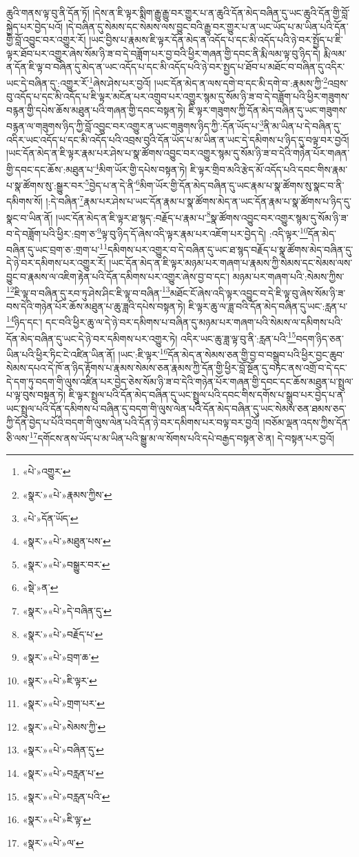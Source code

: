 ཆུའི་གནས་ལྟ་བུ་ནི་དོན་ཏོ། །དེས་ན་ཇི་ལྟར་སྨིག་རྒྱུ་རྒྱུ་བར་གྱུར་པ་ན་ཆུའི་དོན་མེད་བཞིན་དུ་ཡང་ཆུའི་དོན་གྱི་བློ་སྐྱེད་པར་བྱེད་པའོ། །དེ་བཞིན་དུ་སེམས་དང་སེམས་ལས་བྱུང་བའི་རྒྱུ་བར་གྱུར་པ་ན་ཡང་ཡོད་པ་མ་ཡིན་པའི་དོན་གྱི་བློ་འབྱུང་བར་འགྱུར་རོ། །ཡང་བྱིས་པ་རྣམས་ཇི་ལྟར་དོན་མེད་ན་འདོད་པ་དང་མི་འདོད་པའི་ཉེ་བར་སྤྱོད་པ་ཇི་ལྟར་ཐོབ་པར་འགྱུར་ཞེས་སོམ་ཉི་ཟ་བ་དེ་བཟློག་པར་བྱ་བའི་ཕྱིར་གཞན་གྱི་དབང་ནི་རྨི་ལམ་ལྟ་བུ་ཉིད་དེ། རྨི་ལམ་ན་དོན་ཇི་ལྟ་བ་བཞིན་དུ་མེད་ན་ཡང་འདོད་པ་དང་མི་འདོད་པའི་ཉེ་བར་སྤྱད་པ་ཐོབ་པ་མཐོང་བ་བཞིན་དུ་འདིར་ཡང་དེ་བཞིན་དུ་:འགྱུར་རོ་\footnote{«པེ་»འགྱུར་}ཞེས་ཤེས་པར་བྱའོ། །ཡང་དོན་མེད་ན་ལས་དགེ་བ་དང་མི་དགེ་བ་:རྣམས་ཀྱི་\footnote{«སྣར་»«པེ་»རྣམས་ཀྱིས་}འབྲས་བུ་འདོད་པ་དང་མི་འདོད་པ་ཇི་ལྟར་མངོན་པར་འགྲུབ་པར་འགྱུར་སྙམ་དུ་སོམ་ཉི་ཟ་བ་དེ་བཟློག་པའི་ཕྱིར་གཟུགས་བརྙན་གྱི་དཔེས་ཆོས་མཐུན་པའི་གཞན་གྱི་དབང་བསྟན་ཏེ། ཇི་ལྟར་གཟུགས་ཀྱི་དོན་མེད་བཞིན་དུ་ཡང་གཟུགས་བརྙན་ལ་གཟུགས་ཉིད་ཀྱི་བློ་འབྱུང་བར་འགྱུར་ན་ཡང་གཟུགས་ཉིད་ཀྱི་:དོན་ཡོད་པ་\footnote{«པེ་»དོན་ཡོད་}ནི་མ་ཡིན་པ་དེ་བཞིན་དུ་འདིར་ཡང་འདོད་པ་དང་མི་འདོད་པའི་འབྲས་བུའི་དོན་ཡོད་པ་མ་ཡིན་ན་ཡང་དེ་དམིགས་པ་ཉིད་དུ་བལྟ་བར་བྱའོ། །ཡང་དོན་མེད་ན་ཇི་ལྟར་རྣམ་པར་ཤེས་པ་སྣ་ཚོགས་འབྱུང་བར་འགྱུར་སྙམ་དུ་སོམ་ཉི་ཟ་བ་དེའི་གཉེན་པོར་གཞན་གྱི་དབང་དང་ཆོས་:མཐུན་པ་\footnote{«སྣར་»«པེ་»མཐུན་པས་}མིག་ཡོར་གྱི་དཔེས་བསྟན་ཏེ། ཇི་ལྟར་གྲིབ་མའི་རྩེད་མོ་འདོད་པའི་དབང་གིས་རྣམ་པ་སྣ་ཚོགས་སུ་:སྒྱུར་བར་\footnote{«སྣར་»«པེ་»བསྒྱུར་བར་}བྱེད་པ་ན་དེ་ནི་\footnote{«སྡེ་»ན་}མིག་ཡོར་གྱི་དོན་མེད་བཞིན་དུ་ཡང་རྣམ་པ་སྣ་ཚོགས་སུ་སྣང་བ་ནི་དམིགས་སོ། །:དེ་བཞིན་\footnote{«སྣར་»«པེ་»དེ་བཞིན་དུ་}རྣམ་པར་ཤེས་པ་ཡང་དོན་རྣམ་པ་སྣ་ཚོགས་མེད་ན་ཡང་དོན་རྣམ་པ་སྣ་ཚོགས་པ་ཉིད་དུ་སྣང་བ་ཡིན་ནོ། །ཡང་དོན་མེད་ན་ཇི་ལྟར་ཐ་སྙད་:བརྗོད་པ་རྣམ་པ་\footnote{«སྣར་»«པེ་»བརྗོད་པ་}སྣ་ཚོགས་འབྱུང་བར་འགྱུར་སྙམ་དུ་སོམ་ཉི་ཟ་བ་དེ་བཟློག་པའི་ཕྱིར་:བྲག་ཅ་\footnote{«སྣར་»«པེ་»བྲག་ཆ་}ལྟ་བུ་ཉིད་དོ་ཞེས་འདི་ལྟར་རྣམ་པར་འཇོག་པར་བྱེད་དེ། :འདི་ལྟར་\footnote{«སྣར་»«པེ་»ཇི་ལྟར་}དོན་མེད་བཞིན་དུ་ཡང་བྲག་ཅ་:གྲག་པ་\footnote{«སྣར་»«པེ་»གྲག་པར་}དམིགས་པར་འགྱུར་བ་དེ་བཞིན་དུ་ཡང་ཐ་སྙད་བརྗོད་པ་སྣ་ཚོགས་མེད་བཞིན་དུ་དེ་ཉེ་བར་དམིགས་པར་འགྱུར་རོ། །ཡང་དོན་མེད་ན་ཇི་ལྟར་མཉམ་པར་གཞག་པ་རྣམས་ཀྱི་སེམས་དང་སེམས་ལས་བྱུང་བ་རྣམས་ལ་འཇིག་རྟེན་པའི་དོན་དམིགས་པར་འགྱུར་ཞེས་བྱ་བ་དང་། མཉམ་པར་གཞག་པའི་:སེམས་ཀྱིས་\footnote{«སྣར་»«པེ་»སེམས་ཀྱི་}ཇི་ལྟ་བ་བཞིན་དུ་རབ་ཏུ་ཤེས་ཤིང་ཇི་ལྟ་བ་བཞིན་\footnote{«སྣར་»«པེ་»བཞིན་དུ་}མཐོང་ངོ་ཞེས་འདི་ལྟར་འབྱུང་བ་དེ་ཇི་ལྟ་བུ་ཞེས་སོམ་ཉི་ཟ་བས་དེའི་གཉེན་པོར་ཆོས་མཐུན་པ་ཆུ་ཟླའི་དཔེས་བསྟན་ཏེ། ཇི་ལྟར་ཆུ་ལ་ཟླ་བའི་དོན་མེད་བཞིན་དུ་ཡང་:རླན་པ་\footnote{«སྣར་»«པེ་»བརླན་པ་}ཉིད་དང་། དང་བའི་ཕྱིར་ཆུ་ལ་དེ་ཉེ་བར་དམིགས་པ་བཞིན་དུ་མཉམ་པར་གཞག་པའི་སེམས་ལ་དམིགས་པའི་དོན་མེད་བཞིན་དུ་ཡང་དེ་ཉེ་བར་དམིགས་པར་འགྱུར་ཏེ། འདིར་ཡང་ཆུ་ཟླ་ལྟ་བུ་ནི་:རླན་པའི་\footnote{«སྣར་»«པེ་»བརླན་པའི་}བདག་ཉིད་ཅན་ཡིན་པའི་ཕྱིར་ཏིང་ངེ་འཛིན་ཡིན་ནོ། །ཡང་:ཇི་ལྟར་\footnote{«སྣར་»«པེ་»ཇི་ལྟ་}དོན་མེད་ན་སེམས་ཅན་གྱི་བྱ་བ་བསྒྲུབ་པའི་ཕྱིར་བྱང་ཆུབ་སེམས་དཔའ་དེ་ཁོ་ན་ཉིད་རྟོགས་པ་རྣམས་སེམས་ཅན་རྣམས་ཀྱི་དོན་གྱི་ཕྱིར་བློ་སྔོན་དུ་བཏང་ནས་འགྲོ་བ་དེ་དང་དེ་དག་ཏུ་བདག་གི་ལུས་འཛིན་པར་བྱེད་ཅེས་སོམ་ཉི་ཟ་བ་དེའི་གཉེན་པོར་གཞན་གྱི་དབང་དང་ཆོས་མཐུན་པ་སྤྲུལ་པ་ལྟ་བུས་བསྟན་ཏེ། ཇི་ལྟར་སྤྲུལ་པའི་དོན་མེད་བཞིན་དུ་ཡང་སྤྲུལ་པའི་དབང་གིས་དགོས་པ་སྒྲུབ་པར་བྱེད་པ་ན་ཡང་སྤྲུལ་པའི་དོན་དམིགས་པ་བཞིན་དུ་བདག་གི་ལུས་ལེན་པའི་དོན་མེད་བཞིན་དུ་ཡང་སེམས་ཅན་ཐམས་ཅད་ཀྱི་དོན་བྱེད་པ་པོའི་བདག་གི་ལུས་ལེན་པའི་དོན་ཉེ་བར་དམིགས་པར་བལྟ་བར་བྱའོ། །བཅོམ་ལྡན་འདས་ཀྱིས་དོན་ཅི་ལས་\footnote{«སྣར་»«པེ་»ལ་}དགོངས་ནས་ཡོད་པ་མ་ཡིན་པའི་སྒྱུ་མ་ལ་སོགས་པའི་དཔེ་བརྒྱད་བསྟན་ཅེ་ན། དེ་བསྟན་པར་བྱའོ། 